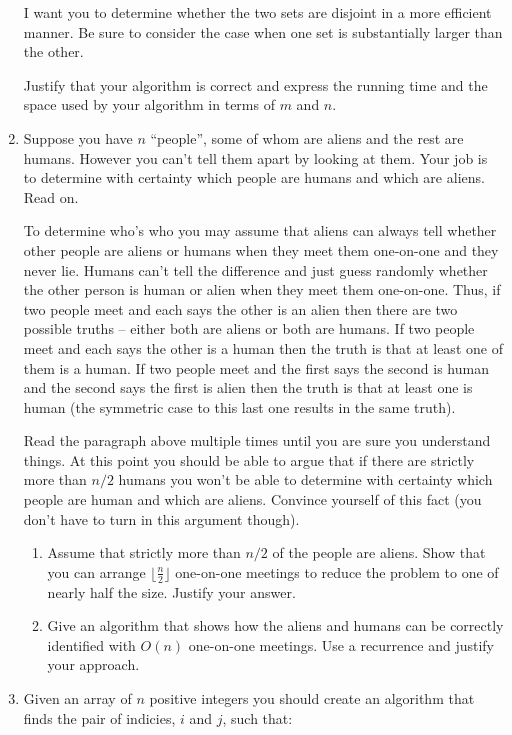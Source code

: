 \documentclass[11pt]{article}
\begin{document}
\begin{enumerate}[1.]
I want you to determine whether the two sets are disjoint in a more efficient manner.  Be sure to consider the case when one set is substantially larger than the other. 

Justify that your algorithm is correct and express the running time and the space used by your algorithm in terms of $m$ and $n$. 


\item  Suppose you have $n$ ``people'', some of whom are aliens and the rest are humans.  However you can't tell them apart by looking at them.  Your job is to determine with certainty which people are humans and which are aliens.  Read on.   

To determine who's who you may assume that aliens can always tell whether other people are aliens or humans when they meet them one-on-one and they never lie.  Humans can't tell the difference and just guess randomly whether the other person is human or alien when they meet them one-on-one.  Thus, if two people meet and each says the other is an alien then there are two possible truths -- either both are aliens or both are humans.  If two people meet and each says the other is a human then the truth is that at least one of them is a human.  If two people meet and the first says the second is human and the second says the first is alien then the truth is that at least one is human (the symmetric case to this last one results in the same truth).  

Read the paragraph above multiple times until you are sure you understand things.  At this point you should be able to argue that if there are strictly more than $n/2$ humans you won't be able to determine with certainty which people are human and which are aliens.  Convince yourself of this fact (you don't have to turn in this argument though).  

\begin{enumerate} 
\item  Assume that strictly more than $n/2$ of the people are aliens.  Show that you can arrange $\lfloor \frac{n}{2} \rfloor$ one-on-one meetings to reduce the problem to one of nearly half the size.  Justify your answer.  
\item  Give an algorithm that shows how the aliens and humans can be correctly identified with $O(n)$ one-on-one meetings. Use a recurrence and justify your approach.  
\end{enumerate} 

\item Given an array of $n$ positive integers you should create an algorithm that finds the pair of indicies, $i$ and $j$, such that:  


\end{enumerate}
\end{document}
